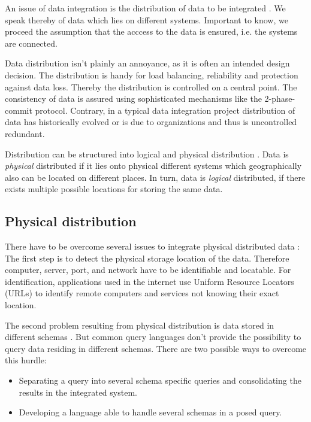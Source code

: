 An issue of data integration is the distribution of data to be integrated \cite[p. 51]{DBLP:books/dp/LeserN2006}. We speak thereby of data which lies on different systems. 
Important to know, we proceed the assumption that the acccess to the data is ensured, i.e. the systems are connected.

Data distribution isn't plainly an annoyance, as it is often an intended design decision\cite[p. 54]{DBLP:books/dp/LeserN2006}. The distribution is handy for load balancing, reliability and protection against data loss. Thereby the distribution is controlled on a central point. 
The consistency of data is assured using sophisticated mechanisms like the 2-phase-commit protocol\cite[p. 54]{DBLP:books/dp/LeserN2006}. Contrary, in a typical data integration project distribution of data has historically evolved or is due to organizations and thus is uncontrolled redundant.

Distribution can be structured into logical and physical distribution \cite[p. 51]{DBLP:books/dp/LeserN2006}. Data is \textit{physical} distributed if it lies onto physical different systems
which geographically also can be located on different places. In turn, data is \textit{logical} distributed, if there exists multiple possible locations for storing the same data. 

\subsection{Physical distribution}
There have to be overcome several issues to integrate physical distributed data \cite[p. 51]{DBLP:books/dp/LeserN2006}: The first step is to detect the physical storage location of the data. Therefore computer, server, port, and network have to be identifiable and locatable. For identification, applications used in the internet use Uniform Resource Locators (URLs) to identify remote computers and services not knowing their exact location.

The second problem resulting from physical distribution is data stored in different schemas \cite[p. 52]{DBLP:books/dp/LeserN2006}. But common query languages don't provide the possibility to query data residing in different schemas. There are two possible ways to overcome this hurdle:
\begin{itemize}
\item Separating a query into several schema specific queries and consolidating the results in the integrated system.
\item Developing a language able to handle several schemas in a posed query.
\end{itemize}

